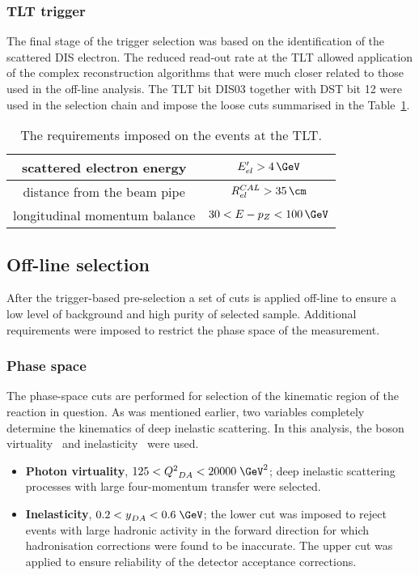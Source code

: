 \subsubsection{TLT trigger}
\label{subsubsec:tltcuts}
The final stage of the trigger selection was based on the identification of the scattered DIS electron. The reduced read-out rate at the TLT allowed application of the complex reconstruction algorithms that were much closer related to those used in the off-line analysis. The TLT bit \textsf{DIS03} together with DST bit 12 were used in the selection chain and impose the loose cuts summarised in the Table~\ref{tab:TLTDSTreq}.
\begin{table}
\centering
\begin{tabular}{|c|c|}
\hline scattered electron energy & $E'_{el}>4\,\GeV$ \\ 
\hline distance from the beam pipe  & $R_{el}^{CAL}>35\,\cm$ \\ 
\hline longitudinal momentum balance & $30<E-p_Z<100\,\GeV$\\
\hline 
\end{tabular} 
\caption{The requirements imposed on the events at the TLT.}
\label{tab:TLTDSTreq}
\end{table}

\subsection{Off-line selection}
\label{subsec:offlineselect}

After the trigger-based pre-selection a set of cuts is applied off-line to ensure a low level of background and high purity of selected sample. Additional requirements were imposed to restrict the phase space of the measurement. 

\subsubsection{Phase space}
\label{subsubsec:phasespace}
The phase-space cuts are performed for selection of the kinematic region of the reaction in question. As was mentioned earlier, two variables completely determine the kinematics of deep inelastic scattering. In this analysis, the boson virtuality \qsq~and inelasticity \y~were used.
\begin{itemize}
	\item \textbf{Photon virtuality}, $125 < \qsq_{DA} < 20000\;\GeV^2$;  deep inelastic scattering processes with large four-momentum transfer were selected.
	\item \textbf{Inelasticity}, $0.2 < \y_{DA} < 0.6\;\GeV$; the lower cut was imposed to reject events with large hadronic activity in the forward direction for which hadronisation corrections were found to be inaccurate. The upper cut was applied to ensure reliability of the detector acceptance corrections.
\end{itemize}

